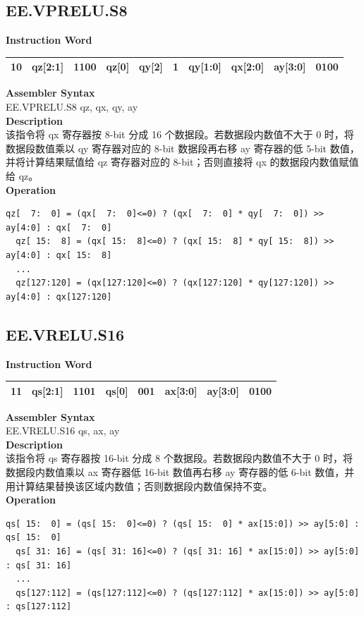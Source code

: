 \clearpage
\subsection{EE.VPRELU.S8}\label{instruction:EEVPRELUS8}
\setlength\tabcolsep{6pt}
\textbf{Instruction Word} \\
\begin{tabular}{|c|c|c|c|c|c|c|c|c|c|}
	\hline
	10 & qz[2:1] & 1100 & qz[0] & qy[2] & 1 & qy[1:0] & qx[2:0] & ay[3:0] & 0100 \\
	\hline
\end{tabular}

\textbf{Assembler Syntax} \\
EE.VPRELU.S8 qz, qx, qy, ay \\
\textbf{Description} \\
该指令将 qx 寄存器按 8-bit 分成 16 个数据段。若数据段内数值不大于 0 时，将数据段数值乘以 qy 寄存器对应的 8-bit 数据段再右移 ay 寄存器的低 5-bit 数值，并将计算结果赋值给 qz 寄存器对应的 8-bit；否则直接将 qx 的数据段内数值赋值给 qz。\\
\textbf{Operation}
\begin{lstlisting}[escapeinside=`?]
  qz[  7:  0] = (qx[  7:  0]<=0) ? (qx[  7:  0] * qy[  7:  0]) >> ay[4:0] : qx[  7:  0]
  qz[ 15:  8] = (qx[ 15:  8]<=0) ? (qx[ 15:  8] * qy[ 15:  8]) >> ay[4:0] : qx[ 15:  8]
  ...
  qz[127:120] = (qx[127:120]<=0) ? (qx[127:120] * qy[127:120]) >> ay[4:0] : qx[127:120]
\end{lstlisting}

\clearpage
\subsection{EE.VRELU.S16}\label{instruction:EEVRELUS16}
\setlength\tabcolsep{6pt}
\textbf{Instruction Word} \\
\begin{tabular}{|c|c|c|c|c|c|c|c|}
	\hline
	11 & qs[2:1] & 1101 & qs[0] & 001 & ax[3:0] & ay[3:0] & 0100 \\
	\hline
\end{tabular}

\textbf{Assembler Syntax} \\
EE.VRELU.S16 qs, ax, ay \\
\textbf{Description} \\
该指令将 qs 寄存器按 16-bit 分成 8 个数据段。若数据段内数值不大于 0 时，将数据段内数值乘以 ax 寄存器低 16-bit 数值再右移 ay 寄存器的低 6-bit 数值，并用计算结果替换该区域内数值；否则数据段内数值保持不变。\\
\textbf{Operation}
\begin{lstlisting}[escapeinside=`?]
  qs[ 15:  0] = (qs[ 15:  0]<=0) ? (qs[ 15:  0] * ax[15:0]) >> ay[5:0] : qs[ 15:  0]
  qs[ 31: 16] = (qs[ 31: 16]<=0) ? (qs[ 31: 16] * ax[15:0]) >> ay[5:0] : qs[ 31: 16]
  ...
  qs[127:112] = (qs[127:112]<=0) ? (qs[127:112] * ax[15:0]) >> ay[5:0] : qs[127:112]
\end{lstlisting}

